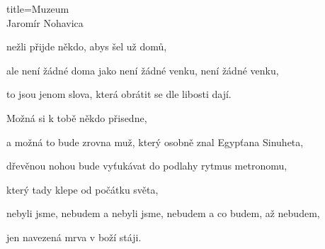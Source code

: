 \begin{song}{title=\centering Muzeum \\\normalsize Jaromír Nohavica  \vspace*{-0.3cm}}
{	nežli přijde někdo, abys šel už domů,
	
	ale není žádné doma jako není žádné venku, není žádné venku,
	
	to jsou jenom slova, která obrátit se dle libosti dají.


\sloka
	Možná si k tobě někdo přisedne,
	
	a možná to bude zrovna muž, který osobně znal Egypťana Sinuheta,
	
	dřevěnou nohou bude vyťukávat do podlahy rytmus metronomu,
	
	který tady klepe od počátku světa,
	
	nebyli jsme, nebudem a nebyli jsme, nebudem a co budem, až nebudem,
	
	jen navezená mrva v boží stáji.
	
	

}
\setcounter{Slokočet}{0}
\end{song}

